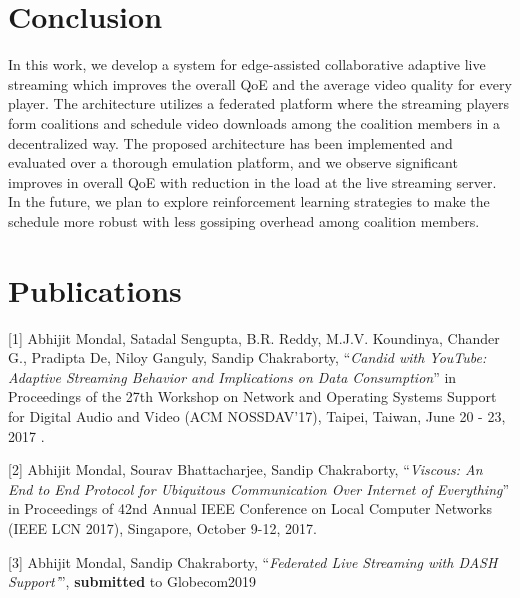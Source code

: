 \section{Conclusion}
In this work, we develop a system for edge-assisted collaborative adaptive live streaming which improves the overall QoE and the average video quality for every player. The architecture utilizes a federated platform where the streaming players form coalitions and schedule video downloads among the coalition members in a decentralized way. The proposed architecture has been implemented and evaluated over a thorough emulation platform, and we observe significant improves in overall QoE with reduction in the load at the live streaming server. In the future, we plan to explore reinforcement learning strategies to make the schedule more robust with less gossiping overhead among coalition members. 

\section*{Publications}
[1] Abhijit Mondal, Satadal Sengupta, B.R. Reddy, M.J.V. Koundinya, Chander G., Pradipta De, Niloy Ganguly, Sandip Chakraborty, ``\textit{Candid with YouTube: Adaptive Streaming Behavior and Implications on Data Consumption}'' in Proceedings of the 27th Workshop on Network and Operating Systems Support for Digital Audio and Video (ACM NOSSDAV'17), Taipei, Taiwan, June 20 - 23, 2017 .

[2] Abhijit Mondal, Sourav Bhattacharjee, Sandip Chakraborty, ``\textit{Viscous: An End to End Protocol for Ubiquitous Communication Over Internet of Everything}'' in Proceedings of 42nd Annual IEEE Conference on Local Computer Networks (IEEE LCN 2017), Singapore, October 9-12, 2017.

[3] Abhijit Mondal, Sandip Chakraborty, ``\textit{Federated Live Streaming with DASH Support'}'', \textbf{submitted} to Globecom2019